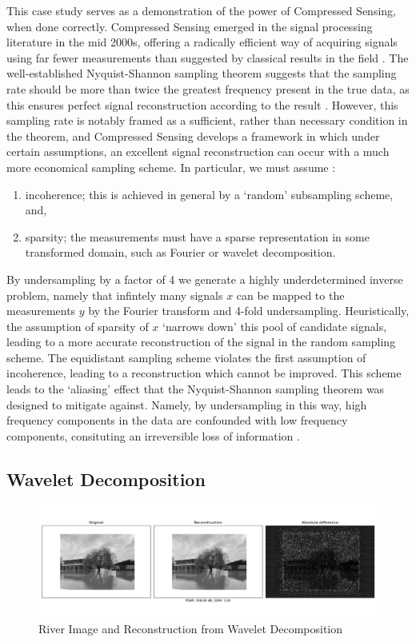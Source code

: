 \documentclass[12pt]{article}
\begin{document}
This case study serves as a demonstration of the power of Compressed Sensing,
when done correctly.
Compressed Sensing emerged in the signal processing literature in the mid 2000s,
offering a radically efficient way of acquiring signals using far fewer measurements than suggested by classical results in the field \cite{candes2005stable}.
The well-established Nyquist-Shannon sampling theorem suggests that the sampling rate should be more than twice the greatest frequency present in the true data,
as this ensures perfect signal reconstruction according to the result \cite{shannon}.
However, this sampling rate is notably framed as a sufficient, rather than necessary condition in the theorem,
and Compressed Sensing develops a framework in which under certain assumptions,
an excellent signal reconstruction can occur with a much more economical sampling scheme.
In particular, we must assume \cite{cs}:
\begin{enumerate}
    \item incoherence; this is achieved in general by a `random' subsampling scheme, and,
    \item sparsity; the measurements must have a sparse representation in some transformed domain, such as Fourier or wavelet decomposition.
\end{enumerate}

By undersampling by a factor of 4 we generate a highly underdetermined inverse problem,
namely that infintely many signals $x$ can be mapped to the measurements $y$ by the Fourier transform and 4-fold undersampling.
Heuristically, the assumption of sparsity of $x$ `narrows down' this pool of candidate signals,
leading to a more accurate reconstruction of the signal in the random sampling scheme.
The equidistant sampling scheme violates the first assumption of incoherence,
leading to a reconstruction which cannot be improved.
This scheme leads to the `aliasing' effect that the Nyquist-Shannon sampling theorem was designed to mitigate against.
Namely, by undersampling in this way, high frequency components in the data are confounded with low frequency components,
consituting an irreversible loss of information \cite{cs}.

\subsection{Wavelet Decomposition}

\begin{figure}[htp]
    \includegraphics[scale=0.45, center]{figures/river_img.png}
    \caption{River Image and Reconstruction from Wavelet Decomposition}
    \label{fig:river_img}
\end{figure}
\end{document}
